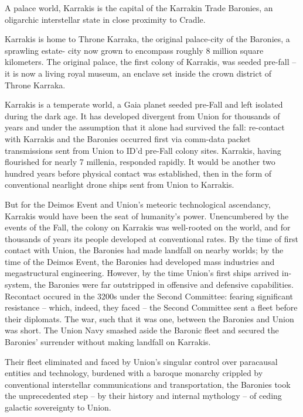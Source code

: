 A palace world, Karrakis is the capital of the Karrakin Trade Baronies, an oligarchic interstellar
state in close proximity to Cradle.

Karrakis is home to Throne Karraka, the original palace-city of the Baronies, a sprawling estate-
city now grown to encompass roughly 8 million square kilometers. The original palace, the first
colony of Karrakis, was seeded pre-fall -- it is now a living royal museum, an enclave set inside
the crown district of Throne Karraka.




Karrakis is a temperate world, a Gaia planet seeded pre-Fall and left isolated during the dark age.
It has developed divergent from Union for thousands of years and under the assumption that it
alone had survived the fall: re-contact with Karrakis and the Baronies occurred first via comm-data
packet transmissions sent from Union to ID’d pre-Fall colony sites. Karrakis, having flourished for
nearly 7 millenia, responded rapidly. It would be another two hundred years before physical
contact was established, then in the form of conventional nearlight drone ships sent from Union to
Karrakis.

But for the Deimos Event and Union’s meteoric technological ascendancy, Karrakis would have
been the seat of humanity’s power. Unencumbered by the events of the Fall, the colony on
Karrakis was well-rooted on the world, and for thousands of years its people developed at
conventional rates. By the time of first contact with Union, the Baronies had made landfall on
nearby worlds; by the time of the Deimos Event, the Baronies had developed mass industries and
megastructural engineering. However, by the time Union’s first ships arrived in-system, the
Baronies were far outstripped in offensive and defensive capabilities. Recontact occured in the
3200s under the Second Committee: fearing significant resistance -- which, indeed, they faced --
the Second Committee sent a fleet before their diplomats. The war, such that it was one, between
the Baronies and Union was short. The Union Navy smashed aside the Baronic fleet and secured
the Baronies’ surrender without making landfall on Karrakis.

Their fleet eliminated and faced by Union’s singular control over paracausal entities and
technology, burdened with a baroque monarchy crippled by conventional interstellar
communications and transportation, the Baronies took the unprecedented step -- by their history
and internal mythology -- of ceding galactic sovereignty to Union.

